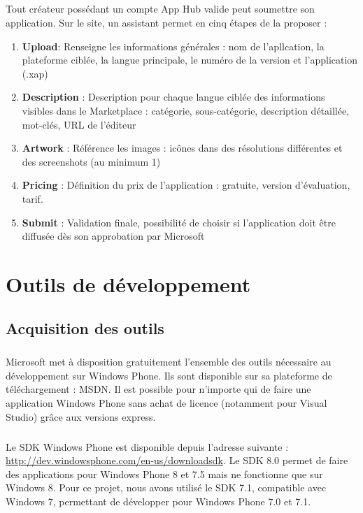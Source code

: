 \documentclass[twoside,UTF8]{EPURapport}
\begin{document}
\paragraph{}
Tout créateur possédant un compte App Hub valide peut soumettre son application. Sur le site, un assistant permet en cinq étapes de la proposer : 
\begin{enumerate}
	\item \textbf{Upload}: Renseigne les informations générales : nom de l'apllcation, la plateforme ciblée, la langue principale, le numéro de la version et l'application (.xap)
	\item \textbf{Description} : Description pour chaque langue ciblée des informations visibles dans le Marketplace : catégorie, sous-catégorie, description détaillée, mot-clés, URL de l'éditeur
	\item \textbf{Artwork} : Référence les images : icônes dans des résolutions différentes et des screenshots (au minimum 1)
	\item \textbf{Pricing} : Définition du prix de l'application : gratuite, version d'évaluation, tarif.
	\item \textbf{Submit} : Validation finale, possibilité de choisir si l'application doit être diffusée dès son approbation par Microsoft
\end{enumerate}


	
\chapter{Outils de développement}
	\section{Acquisition des outils}

\paragraph{}
Microsoft met à disposition gratuitement l'ensemble des outils nécessaire au développement sur Windows Phone. 	Ils sont disponible sur sa plateforme de téléchargement : MSDN. Il est possible pour n'importe qui de faire une application Windows Phone sans achat de licence (notamment pour Visual Studio) grâce aux versions express. 
	
\paragraph{}
Le SDK Windows Phone est disponible depuis l'adresse suivante :       \url{http://dev.windowsphone.com/en-us/downloadsdk}. Le SDK 8.0 permet de faire des applications pour Windows Phone 8 et 7.5 mais ne fonctionne que sur Windows 8. Pour ce projet, nous avons utilisé le SDK 7.1, compatible avec Windows 7, permettant de développer pour Windows Phone 7.0 et 7.1. 
\end{document}
